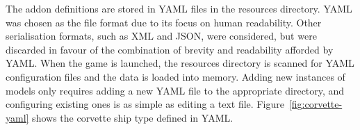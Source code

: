 The addon definitions are stored in YAML files in the resources directory. YAML was chosen as the file format due to its focus on human readability. Other serialisation formats, such as XML and JSON, were considered, but were discarded in favour of the combination of brevity and readability afforded by YAML. When the game is launched, the resources directory is scanned for YAML configuration files and the data is loaded into memory. Adding new instances of models only requires adding a new YAML file to the appropriate directory, and configuring existing ones is as simple as editing a text file. Figure~\ref{fig:corvette-yaml} shows the corvette ship type defined in YAML.
